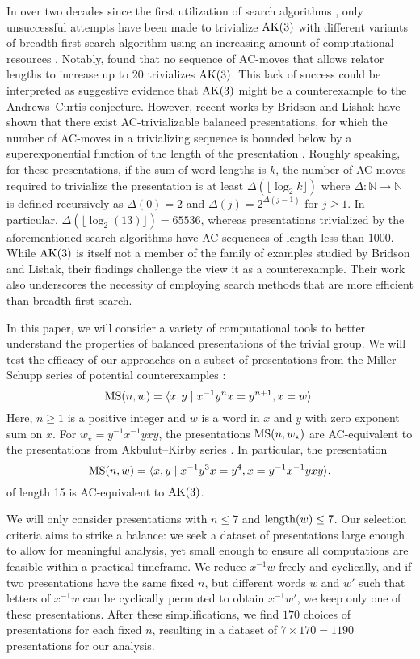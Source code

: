 In over two decades since the first utilization of search algorithms \cite{genetic, bfs-ac}, only unsuccessful attempts have been made to trivialize $\text{AK}(3)$ with different variants of breadth-first search algorithm using an increasing amount of computational resources \cite{Bowman-McCaul, krawiec2016distance, Panteleev-Ushakov}.
Notably, \cite{Panteleev-Ushakov} found that no sequence of AC-moves that allows relator lengths to increase up to 20 trivializes $\text{AK}(3)$.
This lack of success could be interpreted as suggestive evidence that $\text{AK}(3)$ might be a counterexample to the Andrews--Curtis conjecture.
However, recent works by Bridson and Lishak have shown that there exist AC-trivializable balanced presentations, for which the number of AC-moves in a trivializing sequence is bounded below by a superexponential function of the length of the presentation \cite{Bridson, Lishak}.
Roughly speaking, for these presentations, if the sum of word lengths is $k$, the number of AC-moves required to trivialize the presentation is at least $\Delta (\lfloor \log_2 k \rfloor)$ where $\Delta \colon \mathbb{N} \to \mathbb{N}$ is defined recursively as $\Delta(0) = 2$ and $\Delta (j) = 2^{\Delta(j-1)}$ for $j \geq 1$.
In particular, $\Delta (\lfloor \log_2 (13) \rfloor) = 65536$, whereas presentations trivialized by the aforementioned search algorithms have AC sequences of length less than $1000$.
While $\text{AK}(3)$ is itself not a member of the family of examples studied by Bridson and Lishak, their findings challenge the view it as a counterexample.
Their work also underscores the necessity of employing search methods that are more efficient than breadth-first search.

In this paper, we will consider a variety of computational tools to better understand the properties of balanced presentations of the trivial group.
We will test the efficacy of our approaches on a subset of presentations from the Miller--Schupp series of potential counterexamples \cite{Miller--Schupp}:
\[
\text{MS}(n, w) = \langle x, y \mid x^{-1} y^n x = y^{n+1}, x = w\rangle.
\]
Here, $n \ge 1$ is a positive integer and $w$ is a word in $x$ and $y$ with zero exponent sum on $x$.
For $w_\star = y^{-1} x^{-1} y x y$, the presentations $\text{MS}(n, w_\star)$ are AC-equivalent to the presentations from Akbulut--Kirby series \cite{MMS}.
In particular, the presentation
\[
\text{MS}(n, w) = \langle x, y \mid x^{-1} y^3 x = y^{4}, x = y^{-1} x^{-1} y x y\rangle.
\]
of length 15 is AC-equivalent to $\text{AK}(3)$.

We will only consider presentations with $n \leq 7$ and $\operatorname{length}(w) \leq 7$.
Our selection criteria aims to strike a balance: we seek a dataset of presentations large enough to allow for meaningful analysis, yet small enough to ensure all computations are feasible within a practical timeframe.
We reduce $x^{-1}w$ freely and cyclically, and if two presentations have the same fixed $n$, but different words $w$ and $w'$ such that letters of $x^{-1} w$ can be cyclically permuted to obtain $x^{-1} w'$, we keep only one of these presentations.
After these simplifications, we find $170$ choices of presentations for each fixed $n$, resulting in a dataset of $7 \times 170 = 1190$ presentations for our analysis.


